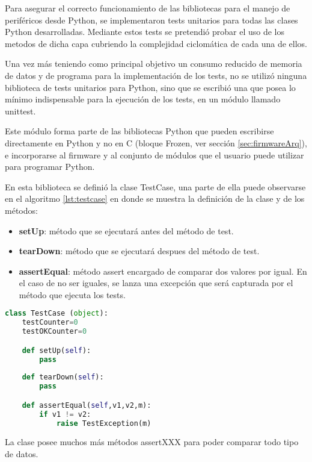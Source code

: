 Para asegurar el correcto funcionamiento de las bibliotecas para el manejo de periféricos desde Python, se implementaron tests unitarios para todas las clases Python desarrolladas. Mediante estos tests se pretendió probar el uso de los metodos de dicha capa cubriendo la complejidad ciclomática de cada una de ellos.

Una vez más teniendo como principal objetivo un consumo reducido de memoria de datos y de programa para la implementación de los tests, no se utilizó ninguna biblioteca de tests unitarios para Python, sino que se escribió una que posea lo mínimo indispensable para la ejecución de los tests, en un módulo llamado unittest. 

Este módulo forma parte de las bibliotecas Python que pueden escribirse directamente en Python y no en C (bloque Frozen, ver sección \ref{sec:firmwareArq}), e incorporarse al firmware y al conjunto de módulos que el usuario puede utilizar para programar Python.

En esta biblioteca se definió la clase TestCase, una parte de ella puede observarse en el algoritmo \ref{lst:testcase} en donde se muestra la definición de la clase y de los métodos:

\begin{itemize}
	\item \textbf{setUp}: método que se ejecutará antes del método de test.
	\item \textbf{tearDown}: método que se ejecutará despues del método de test.
	\item \textbf{assertEqual}: método assert encargado de comparar dos valores por igual. En el caso de no ser iguales, se lanza una excepción que será capturada por el método que ejecuta los tests.
\end{itemize}

\begin{lstlisting}[label={lst:testcase},caption=Clase TestCase utilizada para crear tests unitarios para Python., language={python}]
class TestCase (object):
    testCounter=0
    testOKCounter=0

    def setUp(self):
        pass
    
    def tearDown(self):
        pass

    def assertEqual(self,v1,v2,m):
        if v1 != v2:
            raise TestException(m)
\end{lstlisting}

La clase posee muchos más métodos assertXXX para poder comparar todo tipo de datos.

